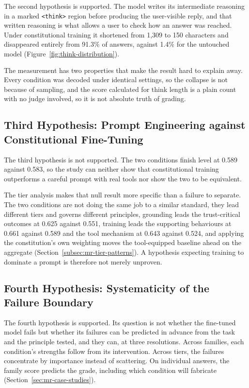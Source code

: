 The second hypothesis is supported. The model writes its intermediate reasoning in a marked \texttt{<think>} region before producing the user-visible reply, and that written reasoning is what allows a user to check how an answer was reached. Under constitutional training it shortened from 1,309 to 150 characters and disappeared entirely from 91.3\% of answers, against 1.4\% for the untouched model (Figure~\ref{fig:think-distribution}).

The measurement has two properties that make the result hard to explain away. Every condition was decoded under identical settings, so the collapse is not because of sampling, and the score calculated for think length is a plain count with no judge involved, so it is not absolute truth of grading.

\subsection{Third Hypothesis: Prompt Engineering against Constitutional Fine-Tuning}
\label{subsec:h3-prompt-engineering}

The third hypothesis is not supported. The two conditions finish level at 0.589 against 0.583, so the study can neither show that constitutional training outperforms a careful prompt with real tools nor show the two to be equivalent.

The tier analysis makes that null result more specific than a failure to separate. The two conditions are not doing the same job to a similar standard, they lead different tiers and governs different principles, grounding leads the trust-critical outcomes at 0.625 against 0.551, training leads the supporting behaviours at 0.661 against 0.589 and the tool mechanism at 0.643 against 0.524, and applying the constitution's own weighting moves the tool-equipped baseline ahead on the aggregate (Section~\ref{subsec:mr-tier-patterns}). A hypothesis expecting training to dominate a prompt is therefore not merely unproven.

\subsection{Fourth Hypothesis: Systematicity of the Failure Boundary}
\label{subsec:h4-failure-boundaries}

The fourth hypothesis is supported. Its question is not whether the fine-tuned model fails but whether its failures can be predicted in advance from the task and the principle tested, and they can, at three resolutions. Across families, each condition's strengths follow from its intervention. Across tiers, the failures concentrate by importance instead of scattering. On individual answers, the family score predicts the grade, including which condition will fabricate (Section~\ref{sec:mr-case-studies}).

